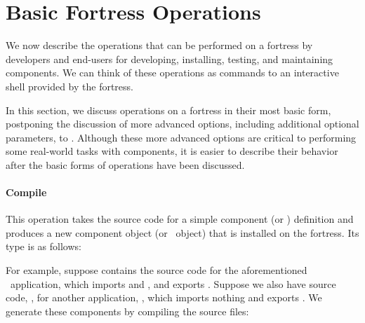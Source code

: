 %
%
%
%

\renewcommand{\api}{A}
\section{Basic Fortress Operations}

We now describe the operations that can be performed on a fortress
by developers and end-users
for developing, installing, testing, and maintaining components.
We can think of these operations
as commands to an interactive shell provided by the fortress.

In this section,
we discuss operations on a fortress in their most basic form,
postponing the discussion of more advanced options,
including additional optional parameters,
to .
Although these more advanced options are critical to performing
some real-world tasks with components,
it is easier to describe their behavior
after the basic forms of operations have been discussed.

\paragraph{Compile}
This operation takes the source code
for a simple component (or \apiN) definition
and produces a new component object (or \apiN\ object)
that is installed on the fortress.
Its type is as follows:


For example,
suppose  contains
the source code for the aforementioned
\ironcryp\ application,
which imports 
and ,
and exports
.
Suppose we also have source code, , for another
application, \ironio, which imports nothing and exports .
We generate these components by compiling the source files:

\\


